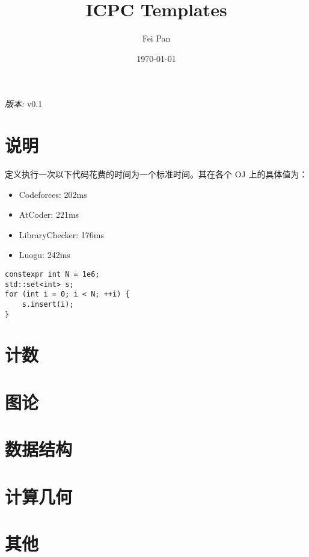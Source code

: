\documentclass[12pt]{ctexart}
\title{ICPC Templates}
\date{\today}
\author{Fei Pan}
\newcommand{\version}{v0.1}
\begin{document}
\maketitle
\begin{center}
    \textit{版本: }\version
\end{center}

\tableofcontents
\newpage

\section{说明}

定义执行一次以下代码花费的时间为一个标准时间。其在各个 OJ 上的具体值为：

\begin{itemize}
\item Codeforces: 202ms
\item AtCoder: 221ms
\item LibraryChecker: 176ms
\item Luogu: 242ms
\end{itemize}
\begin{lstlisting}
constexpr int N = 1e6;
std::set<int> s;
for (int i = 0; i < N; ++i) {
    s.insert(i);
}
\end{lstlisting}
\newpage

\section{计数}



\section{图论}



\section{数据结构}


\section{计算几何}



\section{其他}


\end{document}
